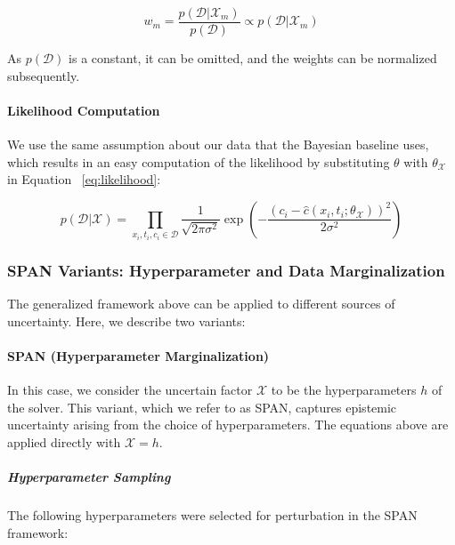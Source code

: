 \begin{equation*}
w_m = \frac{p(\mathcal{D} | \mathcal{X}_m)}{p(\mathcal{D})} \propto p(\mathcal{D} | \mathcal{X}_m)
\end{equation*}

As $p(\mathcal{D})$ is a constant, it can be omitted, and the weights can be normalized subsequently.


\paragraph{Likelihood Computation}

We use the same assumption about our data that the Bayesian baseline uses, which results in an easy computation of the likelihood by substituting $\theta$ with $\theta_{\mathcal{X}}$ in Equation ~\vref{eq:likelihood}:

\begin{equation*}
p(\mathcal{D} | \mathcal{X}) = \prod_{x_i, t_i, c_i \in \mathcal{D}} \frac{1}{\sqrt{2\pi \sigma^2}} \exp \left( -\frac{(c_i - \hat{c}(x_i, t_i; \theta_{\mathcal{X}}))^2}{2\sigma^2} \right)
\end{equation*}

\subsubsection{SPAN Variants: Hyperparameter and Data Marginalization}

The generalized framework above can be applied to different sources of uncertainty. Here, we describe two variants:

\paragraph{SPAN (Hyperparameter Marginalization)}

In this case, we consider the uncertain factor $\mathcal{X}$ to be the hyperparameters $h$ of the solver. This variant, which we refer to as SPAN, captures epistemic uncertainty arising from the choice of hyperparameters. The equations above are applied directly with $\mathcal{X} = h$.

\subparagraph{Hyperparameter Sampling}
The following hyperparameters were selected for perturbation in the SPAN framework:

